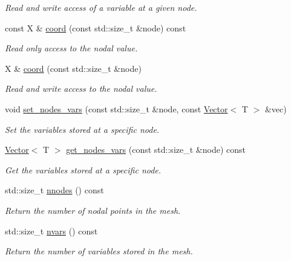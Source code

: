 \begin{DoxyCompactItemize}
\begin{DoxyCompactList}\small\item\em Read and write access of a variable at a given node. \end{DoxyCompactList}\item 
const X \& \hyperlink{classLuna_1_1Mesh1D_a116e935585276efbffe2a378058c12e4}{coord} (const std\+::size\+\_\+t \&node) const
\begin{DoxyCompactList}\small\item\em Read only access to the nodal value. \end{DoxyCompactList}\item 
X \& \hyperlink{classLuna_1_1Mesh1D_a3cf086a7bc3f7846ee8cf57b935ae116}{coord} (const std\+::size\+\_\+t \&node)
\begin{DoxyCompactList}\small\item\em Read and write access to the nodal value. \end{DoxyCompactList}\item 
void \hyperlink{classLuna_1_1Mesh1D_ad28b2c5f3505e1296286288ee2f71f13}{set\+\_\+nodes\+\_\+vars} (const std\+::size\+\_\+t \&node, const \hyperlink{classLuna_1_1Vector}{Vector}$<$ T $>$ \&vec)
\begin{DoxyCompactList}\small\item\em Set the variables stored at a specific node. \end{DoxyCompactList}\item 
\hyperlink{classLuna_1_1Vector}{Vector}$<$ T $>$ \hyperlink{classLuna_1_1Mesh1D_ac26360c5d246da376ebdcaa9fab05e81}{get\+\_\+nodes\+\_\+vars} (const std\+::size\+\_\+t \&node) const
\begin{DoxyCompactList}\small\item\em Get the variables stored at a specific node. \end{DoxyCompactList}\item 
std\+::size\+\_\+t \hyperlink{classLuna_1_1Mesh1D_a83cb9003736324ec955fb091c20dee4b}{nnodes} () const
\begin{DoxyCompactList}\small\item\em Return the number of nodal points in the mesh. \end{DoxyCompactList}\item 
std\+::size\+\_\+t \hyperlink{classLuna_1_1Mesh1D_a6cf5a08c5464bc7de45376cf3f5c1a68}{nvars} () const
\begin{DoxyCompactList}\small\item\em Return the number of variables stored in the mesh. \end{DoxyCompactList}\item 

\end{DoxyCompactItemize}
